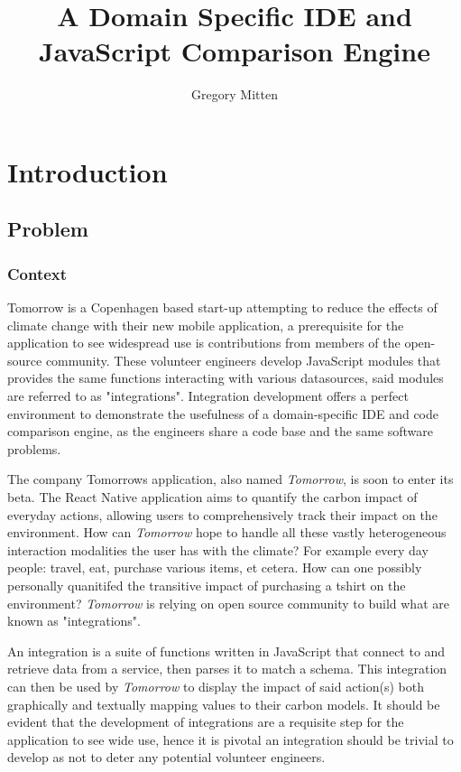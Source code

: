 \documentclass[jou,apacite]{apa6}
\title{A Domain Specific IDE and JavaScript Comparison Engine}
\author{Gregory Mitten}
\affiliation{University of Sussex}
\begin{document}
\maketitle    
                        
\section{Introduction}
\subsection{Problem}
\subsubsection{Context}
Tomorrow is a Copenhagen based start-up attempting to reduce the effects of climate change with their new mobile application, a prerequisite for the application to see widespread use is contributions from members of the open-source community. These volunteer engineers develop  JavaScript modules that provides the same functions interacting with various datasources, said modules are referred to as "integrations". Integration development offers a perfect environment to demonstrate the usefulness of a domain-specific IDE and code comparison engine, as the engineers share a code base and the same software problems. 

The company Tomorrow\textquotesingle s application, also named \textit{Tomorrow}, is soon to enter its beta. The React Native application aims to quantify the carbon impact of everyday actions, allowing users to comprehensively track their impact on the environment. How can \textit{Tomorrow} hope to handle all these vastly heterogeneous interaction modalities the user has with the climate? For example every day people: travel, eat, purchase various items, et cetera. How can one possibly personally quanitifed the transitive impact of purchasing a tshirt on the environment? \textit{Tomorrow} is relying on open source community to build what are known as "integrations".

An integration is a suite of functions written in JavaScript that connect to and retrieve data from a service, then parses it to match a schema. This integration can then be used by \textit{Tomorrow} to display the impact of said action(s) both graphically and textually 	mapping values to their carbon models. It should be evident that the development of integrations are a requisite step for the application to see wide use, hence it is pivotal an integration should be trivial to develop as not to deter any potential volunteer engineers.
\end{document}
